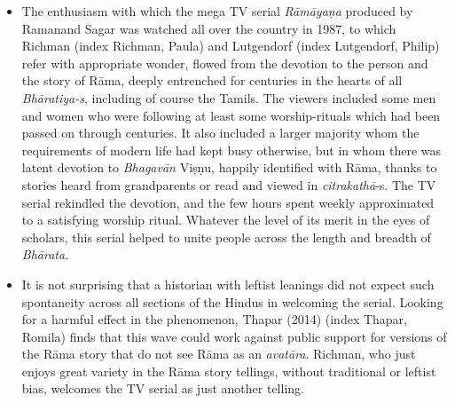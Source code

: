 \begin{itemize}
\item The enthusiasm with which the mega TV serial \textit{Rāmāyaṇa} produced by Ramanand Sagar was watched all over the country in 1987, to which Richman (index Richman, Paula) and Lutgendorf (index Lutgendorf, Philip) refer with appropriate wonder, flowed from the devotion to the person and the story of Rāma, deeply entrenched for centuries in the hearts of all \textit{Bhāratiya-s}, including of course the Tamils. The viewers included some men and women who were following at least some worship-rituals which had been passed on through centuries. It also included a larger majority whom the requirements of modern life had kept busy otherwise, but in whom there was latent devotion to \textit{Bhagavān} Viṣṇu, happily identified with Rāma, thanks to stories heard from grandparents or read and viewed in \textit{citrakathā}-s. The TV serial rekindled the devotion, and the few hours spent weekly approximated to a satisfying worship ritual. Whatever the level of its merit in the eyes of scholars, this serial helped to unite people across the length and breadth of \textit{Bhārata}.

 \item It is not surprising that a historian with leftist leanings did not expect such spontaneity across all sections of the Hindus in welcoming the serial. Looking for a harmful effect in the phenomenon, Thapar (2014) (index Thapar, Romila) finds that this wave could work against public support for versions of the Rāma story that do not see Rāma as an \textit{avatāra}. Richman, who just enjoys great variety in the Rāma story tellings, without traditional or leftist bias, welcomes the TV serial as just another telling.


\end{itemize}
